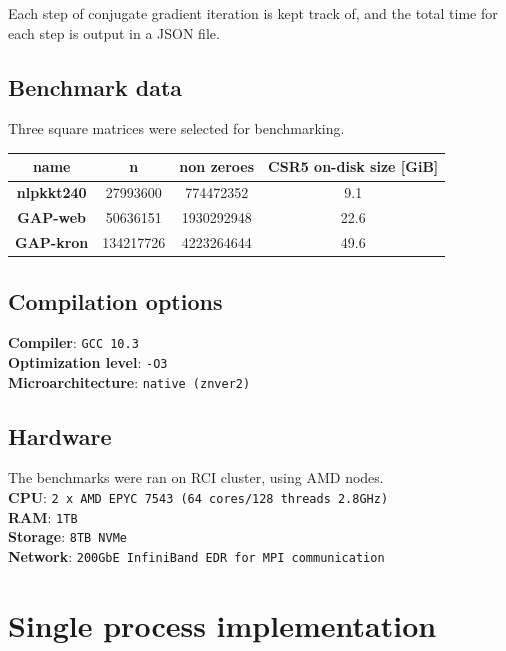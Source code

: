 \documentclass[thesis=M,english]{FITthesis}[2019/12/23]
\begin{document}
Each step of conjugate gradient iteration is kept track of, and the total time
for each step is output in a JSON file.

\subsection{Benchmark data}

Three square matrices were selected for benchmarking.

\begin{tabular}{|c|c|c|c|}
    \hline
    \textbf{name}      & \textbf{n} & \textbf{non zeroes} & \textbf{CSR5 on-disk size} [GiB] \\
    \hline
    \hline
    \textbf{nlpkkt240} & 27993600   & 774472352           & 9.1                              \\
    \hline
    \textbf{GAP-web}   & 50636151   & 1930292948          & 22.6                             \\
    \hline
    \textbf{GAP-kron}  & 134217726  & 4223264644          & 49.6                             \\
    \hline
\end{tabular}


\subsection{Compilation options}

\textbf{Compiler}: \texttt{GCC 10.3} \\
\textbf{Optimization level}: \texttt{-O3} \\
\textbf{Microarchitecture}: \texttt{native (znver2)} \\


\subsection{Hardware}

The benchmarks were ran on RCI cluster, using AMD nodes.\\
\textbf{CPU}: \texttt{2 x AMD EPYC 7543 (64 cores/128 threads 2.8GHz)} \\
\textbf{RAM}: \texttt{1TB}\\
\textbf{Storage}: \texttt{8TB NVMe} \\
\textbf{Network}: \texttt{200GbE InfiniBand EDR for MPI communication}


\section{Single process implementation}
\end{document}
